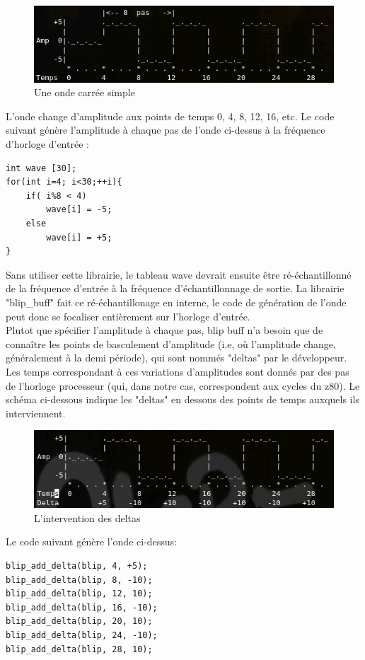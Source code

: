 \documentclass[french]{report}
\begin{document}
\begin{figure}[!h]
\centering
\includegraphics[scale=0.5]{images/Wave1.jpg}
\caption{Une onde carrée simple}
\label{WAV1}
\end{figure}

L'onde change d'amplitude aux points de temps 0, 4, 8, 12, 16, etc.
Le code suivant génère l'amplitude à chaque pas de l'onde ci-dessus à la fréquence d'horloge d'entrée : 
\begin{lstlisting}
int wave [30];
for(int i=4; i<30;++i){
	if( i%8 < 4)
		wave[i] = -5;
	else 
		wave[i] = +5;
}
\end{lstlisting}
Sans utiliser cette librairie, le tableau wave devrait ensuite être ré-échantillonné de la fréquence d'entrée à la fréquence d'échantillonnage de sortie. La librairie "blip\_buff" fait ce ré-échantillonage en interne, le code de génération de l'onde peut donc se focaliser entièrement sur l'horloge d'entrée.\\
Plutot que spécifier l'amplitude à chaque pas, blip buff n'a besoin que de connaître les points de basculement d'amplitude (i.e, où l'amplitude change, généralement à la demi période), qui sont nommés "deltas" par le développeur. Les temps correspondant à ces variations d'amplitudes sont donnés par des pas de l'horloge processeur (qui, dans notre cas, correspondent aux cycles du z80). 
Le schéma ci-dessous indique les "deltas" en dessous des points de temps auxquels ils interviennent.

\begin{figure}[!h]
\centering
\includegraphics[scale=0.5]{images/Wave2.jpg}
\caption{L'intervention des deltas}
\label{WAV2}
\end{figure}

Le code suivant génère l'onde ci-dessus:
\begin{lstlisting}
blip_add_delta(blip, 4, +5);
blip_add_delta(blip, 8, -10);
blip_add_delta(blip, 12, 10);
blip_add_delta(blip, 16, -10);
blip_add_delta(blip, 20, 10);
blip_add_delta(blip, 24, -10);
blip_add_delta(blip, 28, 10);
\end{lstlisting}
\end{document}
